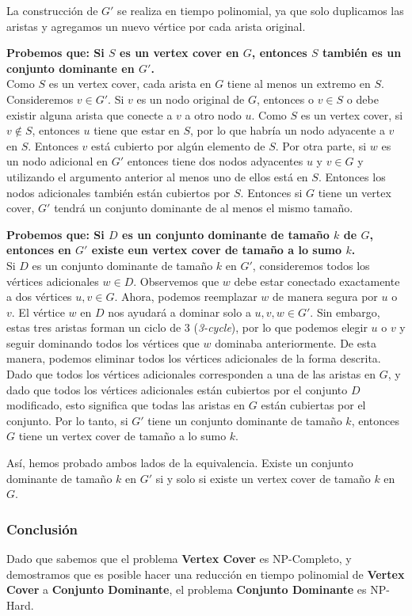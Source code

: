 \documentclass[a4paper,12pt]{article}
\begin{document}
La construcci\'on de $G'$ se realiza en tiempo polinomial, ya que solo duplicamos las aristas y agregamos un nuevo v\'ertice por cada arista original.

\textbf{Probemos que: Si $S$ es un vertex cover en $G$, entonces $S$ tambi\'en es un conjunto dominante en $G'$.}\\
    Como $S$ es un vertex cover, cada arista en $G$ tiene al menos un extremo en $S$. Consideremos $v \in G'$. Si $v$ es un nodo original de $G$, entonces
    o $v \in S$ o debe existir alguna arista que conecte a $v$ a otro nodo $u$. Como $S$ es un vertex cover, si $v \notin S$, entonces $u$ tiene que estar en $S$, por lo que habría un nodo adyacente a $v$ en $S$. Entonces $v$ está cubierto por algún elemento de $S$.
    Por otra parte, si $w$ es un nodo adicional en $G'$ entonces tiene dos nodos adyacentes $u$ y $v \in G$ y utilizando el argumento anterior al menos uno de ellos está en $S$.
    Entonces los nodos adicionales también están cubiertos por $S$. Entonces si $G$ tiene un vertex cover, $G'$ tendrá un conjunto dominante de al menos el mismo tamaño.
    

\textbf{Probemos que: Si $D$ es un conjunto dominante de tamaño $k$ de $G$, entonces en $G'$ existe eun vertex cover de tamaño a lo sumo $k$.} \\
Si $D$ es un conjunto dominante de tamaño $k$ en $G'$, consideremos todos los vértices adicionales $w \in D$. 
Observemos que $w$ debe estar conectado exactamente a dos vértices $u,v \in G$.
Ahora, podemos reemplazar $w$ de manera segura por $u$ o $v$. El vértice $w$ en $D$ nos ayudará a dominar solo a $u, v, w \in G'$.
Sin embargo, estas tres aristas forman un ciclo de 3 (\textit{3-cycle}), por lo que podemos elegir $u$ o $v$ y seguir dominando todos los vértices que $w$ dominaba anteriormente. 
De esta manera, podemos eliminar todos los vértices adicionales de la forma descrita. 
Dado que todos los vértices adicionales corresponden a una de las aristas en $G$, y dado que todos los vértices adicionales están cubiertos por el conjunto $D$ modificado, esto significa que todas las aristas en $G$ están cubiertas por el conjunto.
Por lo tanto, si $G'$ tiene un conjunto dominante de tamaño $k$, entonces $G$ tiene un vertex cover de tamaño a lo sumo $k$.



Así, hemos probado ambos lados de la equivalencia. Existe un conjunto dominante de tamaño $k$ en $G'$ si y solo si existe un vertex cover de tamaño $k$ en $G$. 

\subsubsection{Conclusión}
Dado que sabemos que el problema \textbf{Vertex Cover} es NP-Completo, y demostramos que es posible hacer una reducción en tiempo polinomial de \textbf{Vertex Cover} a \textbf{Conjunto Dominante}, el problema \textbf{Conjunto Dominante} es NP-Hard.
\end{document}
